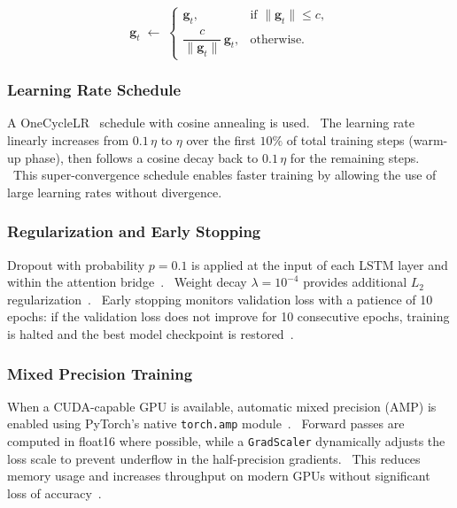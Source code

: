 \documentclass[12pt,a4paper]{report}
\begin{document}
\begin{equation}
\mathbf{g}_t \;\leftarrow\;
\begin{cases}
\mathbf{g}_t, & \text{if } \|\mathbf{g}_t\| \le c, \\[4pt]
\dfrac{c}{\|\mathbf{g}_t\|}\,\mathbf{g}_t, & \text{otherwise}.
\end{cases}
\label{eq:grad_clip}
\end{equation}

\subsubsection{Learning Rate Schedule}

A OneCycleLR~\cite{smith2019} schedule with cosine annealing is used.  The learning rate linearly increases from $0.1\,\eta$ to $\eta$ over the first $10\%$ of total training steps (warm-up phase), then follows a cosine decay back to $0.1\,\eta$ for the remaining steps.  This super-convergence schedule enables faster training by allowing the use of large learning rates without divergence.

\subsubsection{Regularization and Early Stopping}

Dropout with probability $p = 0.1$ is applied at the input of each LSTM layer and within the attention bridge~\cite{srivastava2014}.  Weight decay $\lambda = 10^{-4}$ provides additional $L_2$ regularization~\cite{loshchilov2019}.  Early stopping monitors validation loss with a patience of 10 epochs: if the validation loss does not improve for 10 consecutive epochs, training is halted and the best model checkpoint is restored~\cite{prechelt1998}.

\subsubsection{Mixed Precision Training}

When a CUDA-capable GPU is available, automatic mixed precision (AMP) is enabled using PyTorch's native \texttt{torch.amp} module~\cite{paszke2019,micikevicius2018}.  Forward passes are computed in float16 where possible, while a \texttt{GradScaler} dynamically adjusts the loss scale to prevent underflow in the half-precision gradients.  This reduces memory usage and increases throughput on modern GPUs without significant loss of accuracy~\cite{micikevicius2018}.
\end{document}
